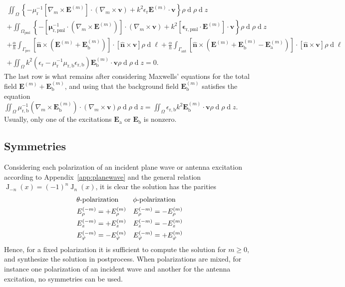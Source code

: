 \documentclass[a4paper,12pt]{article}
\renewcommand{\vec}[1]{\boldsymbol{#1}}
\newcommand{\unitvec}[1]{\hat{\vec{#1}}}
\newcommand{\mrm}[1]{\mathrm{#1}}
\newcommand{\diff}{\operatorname{d}\!}
\newcommand{\Ev}{\vec{E}}
\newcommand{\nuv}{\unitvec{n}}
\newcommand{\BesselJ}{\operatorname{J}}
\newcommand{\vv}{\vec{v}}
\newcommand{\epsm}{\boldsymbol{\epsilon}}
\newcommand{\mum}{\boldsymbol{\mu}}
\begin{document}
\begin{multline}
  \iint_{\Omega} \left\{ - \mu_{\mrm{r}}^{-1}[\nabla_{m}\times\Ev^{(m)}]\cdot(\nabla_{m}\times\vv) + k^{2}\epsilon_{\mrm{r}} \Ev^{(m)}\cdot\vv \right\} \rho\diff\rho\diff z \\
  + \iint_{\Omega_{\mrm{pml}}} \left\{ -[\mum_{\mrm{r,pml}}^{-1}\cdot(\nabla_{m}\times\Ev^{(m)})]\cdot(\nabla_{m}\times\vv) + k^{2}[\epsm_{\mrm{r,pml}}\cdot\Ev^{(m)}]\cdot\vv \right\} \rho\diff\rho\diff z \\
  + \frac{\alpha}{h}\int_{\Gamma_{\mrm{pec}}} [\nuv\times(\Ev^{(m)} + \Ev_{\mrm{b}}^{(m)})] \cdot [\nuv\times\vv] \rho\diff\ell 
  + \frac{\alpha}{h}\int_{\Gamma_{\mrm{ant}}} [\nuv\times(\Ev^{(m)} + \Ev_{\mrm{b}}^{(m)} - \Ev_{\mrm{a}}^{(m)})] \cdot [\nuv\times\vv] \rho\diff\ell \\
  + \iint_{\Omega} k^{2}(\epsilon_{\mrm{r}} - \mu_{\mrm{r}}^{-1}\mu_{\mrm{r,b}}\epsilon_{\mrm{r,b}})\Ev_{\mrm{b}}^{(m)}\cdot\vv \rho\diff\rho\diff z
  = 0.
  \label{eq:femformulation}
\end{multline}
The last row is what remains after considering Maxwells' equations for
the total field $\Ev^{(m)}+\Ev_{\mrm{b}}^{(m)}$, and using that the
background field $\Ev_{\mrm{b}}^{(m)}$ satisfies the equation
$\iint_{\Omega}\mu_{\mrm{r,b}}^{-1}
(\nabla_{m}\times\Ev_{\mrm{b}}^{(m)}) \cdot (\nabla_{m}\times\vv)
\rho\diff\rho\diff z = \iint_{\Omega}
\epsilon_{\mrm{r,b}}k^{2}\Ev_{\mrm{b}}^{(m)}\cdot\vv
\rho\diff\rho\diff z$. Usually, only one of the excitations
$\Ev_{\mrm{a}}$ or $\Ev_{\mrm{b}}$ is nonzero.



\subsection{Symmetries}
\label{sec:symmetries}

Considering each polarization of an incident plane wave or antenna
excitation according to Appendix~\ref{app:planewave} and the general
relation $\BesselJ_{-n}(x) = (-1)^{n}\BesselJ_{n}(x)$, it is clear the
solution has the parities
\begin{align}
  &\hspace{-1cm}\text{$\theta$-polarization} && \hspace{-1cm}\text{$\phi$-polarization} \notag \\
  E_{\rho}^{(-m)} &= +E_{\rho}^{(m)} & E_{\rho}^{(-m)} &= -E_{\rho}^{(m)} \\
  E_{z}^{(-m)} &= +E_{z}^{(m)} & E_{z}^{(-m)} &= -E_{z}^{(m)} \\
  E_{\varphi}^{(-m)} &= -E_{\varphi}^{(m)} & E_{\varphi}^{(-m)} &= +E_{\varphi}^{(m)} 
\end{align}
Hence, for a fixed polarization it is sufficient to compute the
solution for $m\geq0$, and synthesize the solution in
postprocess. When polarizations are mixed, for instance one
polarization of an incident wave and another for the antenna
excitation, no symmetries can be used.
\end{document}
